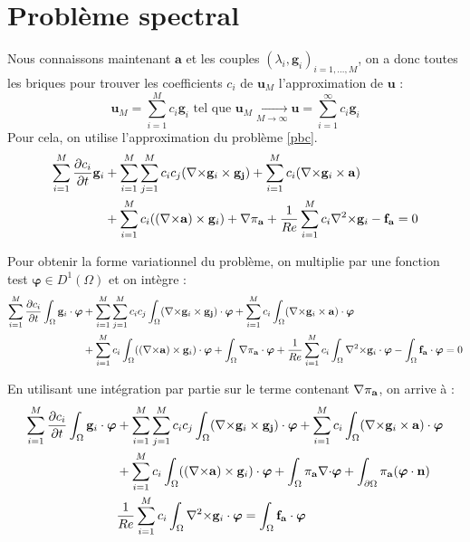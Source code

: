 \section{Problème spectral}
\label{spectre}
Nous connaissons maintenant $\mathbf{a}$ et les couples $(\lambda_i,\mathbf{g}_i)_{i=1,\dots,M}$, on a donc toutes les briques pour trouver les coefficients $c_i$ de $\mathbf{u}_M$ l'approximation de $\mathbf{u}$ :
\[\mathbf{u}_M= \sum_{i=1}^M c_i\mathbf{g}_i\mbox{ tel que } \mathbf{u}_M\underset{M\rightarrow\infty}{\longrightarrow} \mathbf{u}=\sum_{i=1}^\infty c_i\mathbf{g}_i\]
Pour cela, on utilise l'approximation du problème \ref{pbc}.
\begin{align*}
\sum_{i=1}^M\frac{\partial c_i}{\partial t}\mathbf{g}_i &+ \sum_{i=1}^M\sum_{j=1}^Mc_ic_j({\nabla\times}\mathbf{g}_i\times \mathbf{g_j}) + \sum_{i=1}^Mc_i({\nabla\times}\mathbf{g}_i\times \mathbf{a})\\
& +  \sum_{i=1}^Mc_i(({\nabla\times}\mathbf{a})\times \mathbf{g}_i) + {\nabla} \pi_{\mathbf{a}} +\frac{1}{Re}\sum_{i=1}^Mc_i{\nabla^2\times}\mathbf{g}_i - \mathbf{f_a} = 0\\
\end{align*}

Pour obtenir la forme variationnel du problème, on multiplie par une fonction test $\bm{\varphi}\in D^1(\Omega)$ et on intègre :
\begin{align*}
\sum_{i=1}^M\frac{\partial c_i}{\partial t}\int_\Omega\mathbf{g}_i\cdot\bm{\varphi} &+ \sum_{i=1}^M\sum_{j=1}^Mc_ic_j\int_\Omega({\nabla\times}\mathbf{g}_i\times \mathbf{g_j})\cdot\bm{\varphi} + \sum_{i=1}^Mc_i\int_\Omega({\nabla\times}\mathbf{g}_i\times \mathbf{a})\cdot\bm{\varphi}\\
& +  \sum_{i=1}^Mc_i\int_\Omega(({\nabla\times}\mathbf{a})\times \mathbf{g}_i)\cdot\bm{\varphi} + \int_\Omega{\nabla} \pi_{\mathbf{a}}\cdot\bm{\varphi} +\frac{1}{Re}\sum_{i=1}^Mc_i\int_\Omega{\nabla^2\times}\mathbf{g}_i\cdot\bm{\varphi} - \int_\Omega\mathbf{f_a}\cdot\bm{\varphi} = 0\\
\end{align*}

En utilisant une intégration par partie sur le terme contenant ${\nabla}\pi_{\mathbf{a}}$, on arrive à :
\begin{align*}
\sum_{i=1}^M\frac{\partial c_i}{\partial t}\int_\Omega\mathbf{g}_i\cdot\bm{\varphi} &+ \sum_{i=1}^M\sum_{j=1}^Mc_ic_j\int_\Omega({\nabla\times}\mathbf{g}_i\times \mathbf{g_j})\cdot\bm{\varphi} + \sum_{i=1}^Mc_i\int_\Omega({\nabla\times}\mathbf{g}_i\times \mathbf{a})\cdot\bm{\varphi}\\
& +  \sum_{i=1}^Mc_i\int_\Omega(({\nabla\times}\mathbf{a})\times \mathbf{g}_i)\cdot\bm{\varphi} + \int_\Omega\pi_{\mathbf{a}}{\nabla\cdot}\bm{\varphi} + \int_{\partial\Omega}\pi_{\mathbf{a}}(\bm{\varphi}\cdot\mathbf{n})\\
& \frac{1}{Re}\sum_{i=1}^Mc_i\int_\Omega{\nabla^2\times}\mathbf{g}_i\cdot\bm{\varphi} = \int_\Omega\mathbf{f_a}\cdot\bm{\varphi}\\
\end{align*}

